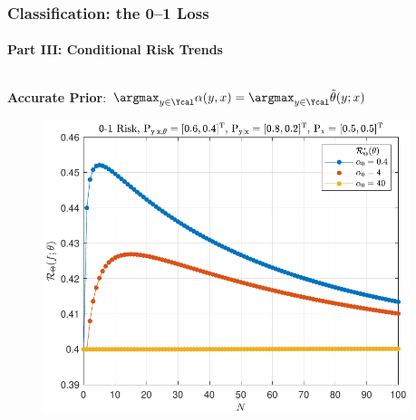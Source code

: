 \documentclass[aspectratio=169,usenames,dvipsnames]{beamer}
\begin{document}
\begin{frame}
\frametitle{Classification: the 0--1 Loss}
\framesubtitle{Part III: Conditional Risk Trends}

\begin{columns}[c]

\begin{column}{0.5\linewidth}

\centering
\textbf{Accurate Prior}: $\argmax_{y \in \Ycal} \alpha(y,x) = \argmax_{y \in \Ycal} \tilde{\theta}(y;x)$
%
\begin{figure}
\centering
\includegraphics[width=0.9\linewidth]{Risk_cond_01_Dir_N_leg_a0__subj_good.pdf}
\end{figure}


\end{column}

\begin{column}{0.5\linewidth}


\end{column}
\end{columns}
\end{frame}
\end{document}
